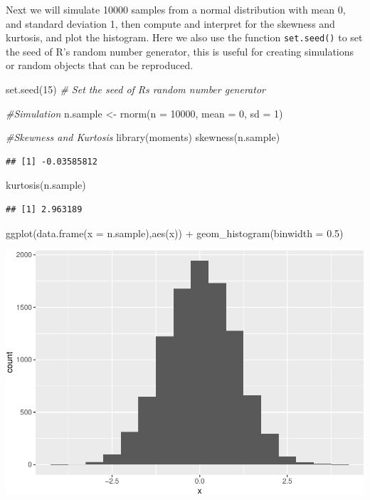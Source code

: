 \documentclass[landscape, 20pt]{extreport}
\newenvironment{Shaded}{\begin{snugshade}}{\end{snugshade}}
\newcommand{\AttributeTok}[1]{\textcolor[rgb]{0.77,0.63,0.00}{#1}}
\newcommand{\CommentTok}[1]{\textcolor[rgb]{0.56,0.35,0.01}{\textit{#1}}}
\newcommand{\DecValTok}[1]{\textcolor[rgb]{0.00,0.00,0.81}{#1}}
\newcommand{\FloatTok}[1]{\textcolor[rgb]{0.00,0.00,0.81}{#1}}
\newcommand{\FunctionTok}[1]{\textcolor[rgb]{0.00,0.00,0.00}{#1}}
\newcommand{\NormalTok}[1]{#1}
\newcommand{\OtherTok}[1]{\textcolor[rgb]{0.56,0.35,0.01}{#1}}
\newcommand{\SpecialCharTok}[1]{\textcolor[rgb]{0.00,0.00,0.00}{#1}}
\theoremstyle{definition}
\theoremstyle{definition}
\theoremstyle{definition}
\theoremstyle{definition}
\theoremstyle{remark}
\begin{document}
Next we will simulate 10000 samples from a normal distribution with mean 0, and standard deviation 1, then compute and interpret for the skewness and kurtosis, and plot the histogram. Here we also use
the function \texttt{set.seed()} to set the seed of R's random number generator, this is useful for creating simulations or random objects that can be reproduced.

\begin{Shaded}
\begin{Highlighting}[]
\FunctionTok{set.seed}\NormalTok{(}\DecValTok{15}\NormalTok{) }\CommentTok{\# Set the seed of R\textquotesingle{}s random number generator}

\CommentTok{\#Simulation}
\NormalTok{n.sample }\OtherTok{\textless{}{-}} \FunctionTok{rnorm}\NormalTok{(}\AttributeTok{n =} \DecValTok{10000}\NormalTok{, }\AttributeTok{mean =} \DecValTok{0}\NormalTok{, }\AttributeTok{sd =} \DecValTok{1}\NormalTok{)}

\CommentTok{\#Skewness and Kurtosis}
\FunctionTok{library}\NormalTok{(moments)}
\FunctionTok{skewness}\NormalTok{(n.sample)}
\end{Highlighting}
\end{Shaded}

\begin{verbatim}
## [1] -0.03585812
\end{verbatim}

\begin{Shaded}
\begin{Highlighting}[]
\FunctionTok{kurtosis}\NormalTok{(n.sample)}
\end{Highlighting}
\end{Shaded}

\begin{verbatim}
## [1] 2.963189
\end{verbatim}

\begin{Shaded}
\begin{Highlighting}[]
\FunctionTok{ggplot}\NormalTok{(}\FunctionTok{data.frame}\NormalTok{(}\AttributeTok{x =}\NormalTok{ n.sample),}\FunctionTok{aes}\NormalTok{(x)) }\SpecialCharTok{+} 
  \FunctionTok{geom\_histogram}\NormalTok{(}\AttributeTok{binwidth =} \FloatTok{0.5}\NormalTok{)}
\end{Highlighting}
\end{Shaded}

\includegraphics{unnamed-chunk-4-1.pdf}
\end{document}
